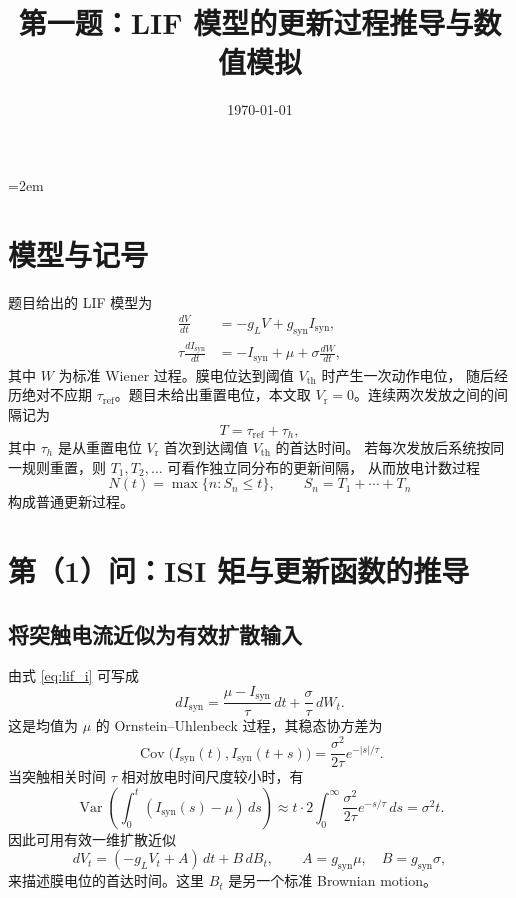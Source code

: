 \documentclass[UTF8]{ctexart}
\title{第一题：LIF 模型的更新过程推导与数值模拟}
\author{}
\date{\today}
\begin{document}
\emergencystretch=2em
\maketitle

\section{模型与记号}

题目给出的 LIF 模型为
\begin{align}
  \frac{dV}{dt} &= -g_L V + g_{\mathrm{syn}} I_{\mathrm{syn}}, \label{eq:lif_v}\\
  \tau \frac{d I_{\mathrm{syn}}}{dt}
  &= - I_{\mathrm{syn}}+\mu+\sigma \frac{dW}{dt}, \label{eq:lif_i}
\end{align}
其中 $W$ 为标准 Wiener 过程。膜电位达到阈值 $V_{\mathrm{th}}$ 时产生一次动作电位，
随后经历绝对不应期 $\tau_{\mathrm{ref}}$。题目未给出重置电位，本文取
$V_{\mathrm{r}}=0$。连续两次发放之间的间隔记为
\[
T=\tau_{\mathrm{ref}}+\tau_h,
\]
其中 $\tau_h$ 是从重置电位 $V_{\mathrm r}$ 首次到达阈值 $V_{\mathrm{th}}$ 的首达时间。
若每次发放后系统按同一规则重置，则 $T_1,T_2,\ldots$ 可看作独立同分布的更新间隔，
从而放电计数过程
\[
N(t)=\max\{n:S_n\le t\},\qquad S_n=T_1+\cdots+T_n
\]
构成普通更新过程。

\section{第（1）问：ISI 矩与更新函数的推导}

\subsection{将突触电流近似为有效扩散输入}

由式 \eqref{eq:lif_i} 可写成
\[
dI_{\mathrm{syn}}
=\frac{\mu-I_{\mathrm{syn}}}{\tau}\,dt+\frac{\sigma}{\tau}\,dW_t.
\]
这是均值为 $\mu$ 的 Ornstein--Uhlenbeck 过程，其稳态协方差为
\[
\operatorname{Cov}\bigl(I_{\mathrm{syn}}(t),I_{\mathrm{syn}}(t+s)\bigr)
=\frac{\sigma^2}{2\tau}e^{-|s|/\tau}.
\]
当突触相关时间 $\tau$ 相对放电时间尺度较小时，有
\[
\operatorname{Var}\left(\int_0^t (I_{\mathrm{syn}}(s)-\mu)\,ds\right)
\approx t\cdot 2\int_0^\infty \frac{\sigma^2}{2\tau}e^{-s/\tau}\,ds
=\sigma^2 t.
\]
因此可用有效一维扩散近似
\begin{equation}
  dV_t=(-g_LV_t+A)\,dt+B\,dB_t,\qquad
  A=g_{\mathrm{syn}}\mu,\quad B=g_{\mathrm{syn}}\sigma,
  \label{eq:effective_diffusion}
\end{equation}
来描述膜电位的首达时间。这里 $B_t$ 是另一个标准 Brownian motion。
\end{document}
